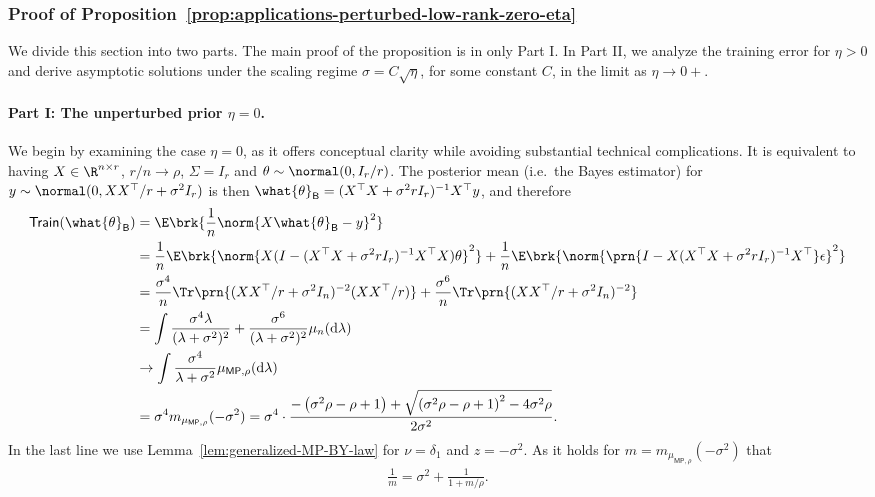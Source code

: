 \documentclass[11pt]{article}
\newcommand{\bysest}{\what{\theta}_{\mathsf{B}}}
\newcommand{\trerr}{\mathsf{Train}}
\newcommand{\de}{\mathrm{d}}
\begin{document}
\subsubsection{Proof of Proposition~\ref{prop:applications-perturbed-low-rank-zero-eta}} \label{proof:applications-perturbed-low-rank-zero-eta}
We divide this section into two parts. The main proof of the proposition is in only Part I. In Part II, we analyze the training error for $\eta > 0$ and derive asymptotic solutions under the scaling regime $\sigma = C\sqrt{\eta}$, for some constant $C$, in the limit as $\eta \to 0+$.
\paragraph{Part I: The unperturbed prior $\eta = 0$.} We begin by examining the case $\eta = 0$, as it offers conceptual clarity while avoiding substantial technical complications. It is equivalent to having $X \in \R^{n \times r}$, $r/n \to \rho$, $\Sigma=I_r$ and $\theta \sim \normal(0, I_r/r)$. The posterior mean (i.e.\ the Bayes estimator) for $y \sim \normal(0, XX^\top/r + \sigma^2 I_r)$ is then $\bysest = (X^\top X+\sigma^2 rI_r)^{-1} X^\top y$, and therefore
\begin{align*}
    \trerr(\bysest) & = \E \brk{\frac{1}{n} \norm{X \bysest -y}^2} \nonumber \\
    & = \frac{1}{n} \E \brk{ \norm{X(I - (X^\top X + \sigma^2 r I_r)^{-1} X^\top X) \theta}^2} + \frac{1}{n} \E \brk{ \norm{\prn{I -X(X^\top X + \sigma^2 r I_r)^{-1} X^\top} \epsilon}^2} \nonumber \\
    & = \frac{\sigma^4}{n} \Tr \prn{(XX^\top/r + \sigma^2 I_n)^{-2} (XX^\top/r)} + \frac{\sigma^6}{n} \Tr \prn{(XX^\top/r + \sigma^2 I_n)^{-2}} \nonumber \\
    & = \int \frac{\sigma^4\lambda}{(\lambda + \sigma^2)^2} + \frac{\sigma^6}{(\lambda + \sigma^2)^2} \mu_n(\de \lambda) \nonumber \\
    & \to \int \frac{\sigma^4}{\lambda + \sigma^2}\mu_{\mathsf{MP, \rho}}(\de \lambda)\nonumber \\
    &= \sigma^4 m_{\mu_{\mathsf{MP, \rho}}}(-\sigma^2) = \sigma^4 \cdot \frac{-\left(\sigma^2 \rho-\rho+1\right) + \sqrt{\left(\sigma^2 \rho-\rho+1\right)^2-4 \sigma^2 \rho}}{2 \sigma^2}.
\end{align*}
In the last line we use Lemma~\ref{lem:generalized-MP-BY-law} for $\nu = \delta_1$ and $z=-\sigma^2$. As it holds for $m = m_{\mu_{\mathsf{MP, \rho}}}(-\sigma^2)$ that
\begin{align*}
\frac{1}{m} = \sigma^2 + \frac{1}{1 + m/\rho}.
\end{align*}
\end{document}
